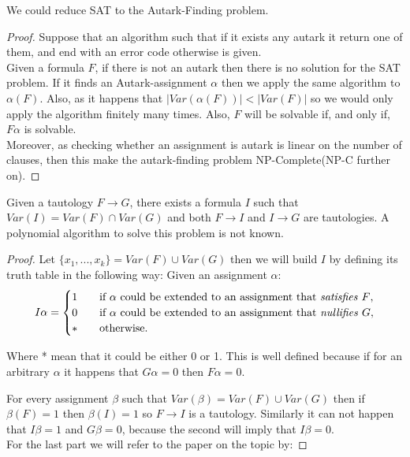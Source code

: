     \begin{proposition} We could reduce SAT to the Autark-Finding problem.
      \begin{proof} Suppose that an algorithm such that if it exists any autark it return one of them, and end with an error code otherwise is given.  \\

        Given a formula $F$, if there is not an autark then there is no solution for the SAT problem. If it finds an Autark-assignment $\alpha$ then we apply the same algorithm to $\alpha(F)$. Also, as it happens that $|Var(\alpha(F))|<|Var(F)|$ so we would only apply the algorithm finitely many times. Also, $F$ will be solvable if, and only if, $F\alpha$ is solvable.	\\

        Moreover, as checking whether an assignment is autark is linear on the number of clauses, then this make the autark-finding problem NP-Complete(NP-C further on).
      \end{proof}
      
    \end{proposition}



    \begin{proposition}
      Given a tautology $F \to G$, there exists a formula $I$ such that $Var(I) = Var(F)\cap Var(G)$ and both $F\to I$ and $I \to G$ are tautologies. A polynomial algorithm to solve this problem is not known. 
    \end{proposition}

    \begin{proof} Let $\{x_1,...,x_k\} = Var(F)\cup Var(G)$ then we will build $I$ by defining its truth table in the following way: Given an assignment $\alpha$:
      \[   
        I\alpha = 
        \begin{cases}
          1&\quad\text{if $\alpha$ could be extended to an assignment that \emph{satisfies} $F$}, \\
          0&\quad\text{if $\alpha$ could be extended to an assignment that \emph{nullifies} $G$},\\
          * &\quad\text{otherwise.} \\ 
        \end{cases}
      \]

      Where * mean that it could be either 0 or 1.  This is well defined because if for an arbitrary $\alpha$ it happens that $G\alpha = 0$ then $F\alpha = 0$.

      For every assignment $\beta$ such that $Var(\beta) = Var(F)\cup Var(G)$ then if $\beta(F) = 1$ then $\beta(I) = 1$ so $F \to I$  is a tautology. Similarly it can not happen that $I\beta = 1 $ and $G\beta = 0$, because the second will imply that   $I\beta = 0$.\\

      For the last part we will refer to the paper on the topic by: 



    \end{proof}

